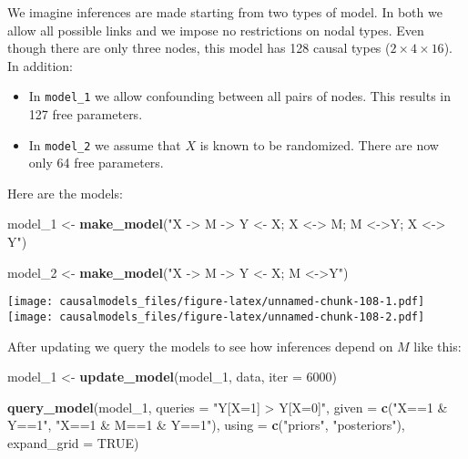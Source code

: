 \documentclass[
  12pt,
]{book}
\newenvironment{Shaded}{\begin{snugshade}}{\end{snugshade}}
\newcommand{\AttributeTok}[1]{\textcolor[rgb]{0.13,0.29,0.53}{#1}}
\newcommand{\ConstantTok}[1]{\textcolor[rgb]{0.56,0.35,0.01}{#1}}
\newcommand{\DecValTok}[1]{\textcolor[rgb]{0.00,0.00,0.81}{#1}}
\newcommand{\FunctionTok}[1]{\textcolor[rgb]{0.13,0.29,0.53}{\textbf{#1}}}
\newcommand{\NormalTok}[1]{#1}
\newcommand{\OtherTok}[1]{\textcolor[rgb]{0.56,0.35,0.01}{#1}}
\newcommand{\StringTok}[1]{\textcolor[rgb]{0.31,0.60,0.02}{#1}}
\begin{document}
We imagine inferences are made starting from two types of model. In both we allow all possible links and we impose no restrictions on nodal types. Even though there are only three nodes, this model has 128 causal types (\(2\times 4 \times 16\)). In addition:

\begin{itemize}
\item
  In \texttt{model\_1} we allow confounding between all pairs of nodes. This results in 127 free parameters.
\item
  In \texttt{model\_2} we assume that \(X\) is known to be randomized. There are now only 64 free parameters.
\end{itemize}

Here are the models:

\begin{Shaded}
\begin{Highlighting}[]
\NormalTok{model\_1 }\OtherTok{\textless{}{-}} 
  \FunctionTok{make\_model}\NormalTok{(}\StringTok{"X {-}\textgreater{} M {-}\textgreater{} Y \textless{}{-} X; X \textless{}{-}\textgreater{} M; M \textless{}{-}\textgreater{}Y; X \textless{}{-}\textgreater{} Y"}\NormalTok{) }

\NormalTok{model\_2 }\OtherTok{\textless{}{-}} 
  \FunctionTok{make\_model}\NormalTok{(}\StringTok{"X {-}\textgreater{} M {-}\textgreater{} Y \textless{}{-} X; M \textless{}{-}\textgreater{}Y"}\NormalTok{) }
\end{Highlighting}
\end{Shaded}

\texttt{[image: causalmodels\_files/figure-latex/unnamed-chunk-108-1.pdf]} \texttt{[image: causalmodels\_files/figure-latex/unnamed-chunk-108-2.pdf]}

After updating we query the models to see how inferences depend on \(M\) like this:

\begin{Shaded}
\begin{Highlighting}[]
\NormalTok{model\_1 }\OtherTok{\textless{}{-}} \FunctionTok{update\_model}\NormalTok{(model\_1, data, }\AttributeTok{iter =} \DecValTok{6000}\NormalTok{)}

\FunctionTok{query\_model}\NormalTok{(model\_1, }
            \AttributeTok{queries =} \StringTok{"Y[X=1] \textgreater{} Y[X=0]"}\NormalTok{,}
            \AttributeTok{given =} \FunctionTok{c}\NormalTok{(}\StringTok{"X==1 \& Y==1"}\NormalTok{, }\StringTok{"X==1 \& M==1 \& Y==1"}\NormalTok{),}
            \AttributeTok{using =} \FunctionTok{c}\NormalTok{(}\StringTok{"priors"}\NormalTok{, }\StringTok{"posteriors"}\NormalTok{), }
            \AttributeTok{expand\_grid =} \ConstantTok{TRUE}\NormalTok{)}
\end{Highlighting}
\end{Shaded}
\end{document}
